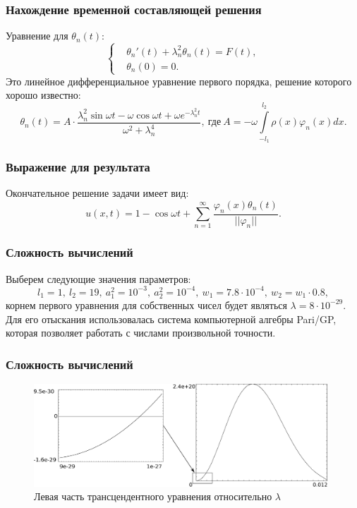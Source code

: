 \documentclass[10pt,pdf,hyperref={unicode}]{beamer}
\begin{document}
\begin{frame}
  \frametitle{Нахождение временной составляющей решения}
  Уравнение для $\theta_n(t)$:
  \begin{equation*}
    \left\{  
    \begin{aligned}
      & \theta_n'(t) + \lambda_n^2 \theta_n(t) = F(t), \\
      & \theta_n (0) = 0.
    \end{aligned}
    \right.
  \end{equation*}
  Это линейное дифференциальное уравнение первого порядка, решение которого хорошо известно:
  \begin{equation*}
    \theta_n(t) = A\cdot\frac{\lambda_n^2 \sin \omega t - \omega \cos \omega t + \omega e^{-\lambda_n^2 t}}{\omega^2 + \lambda_n^4},\ \text{где}\ A=-\omega\int\limits_{-l_1}^{l_2}\rho(x)\varphi_n(x)dx.
  \end{equation*}
\end{frame}

\begin{frame}
  \frametitle{Выражение для результата}
    Окончательное решение задачи имеет вид:
    \begin{equation*}
      u(x,t)= 1 - \cos \omega t + \sum \limits_{n=1}^{\infty} \frac{\varphi_n(x) \theta_n(t)}{||\varphi_n||}.
    \end{equation*}

\end{frame}

\begin{frame}
  \frametitle{Сложность вычислений}
    Выберем следующие значения параметров:
    \begin{equation*}
      l_1=1,\ l_2=19,\ a_1^2=10^{-3},\ a_2^2=10^{-4},\ w_1=7.8\cdot 10^{-4},\ w_2=w_1 \cdot 0.8,
    \end{equation*}
    корнем первого уравнения для собственных чисел будет являться $\lambda=8 \cdot 10^{-29}$.
    Для его отыскания использовалась система компьютерной алгебры Pari/GP, 
    которая позволяет работать с числами произвольной точности.
\end{frame}

\begin{frame}
  \frametitle{Сложность вычислений}
  \begin{figure}[H]
   \includegraphics[width=11cm]{full.eps}
   \caption{Левая часть трансцендентного уравнения относительно $\lambda$}
  \end{figure}
\end{frame}
\end{document}
